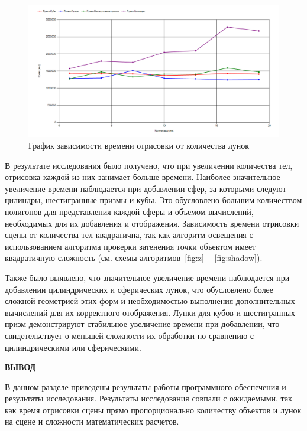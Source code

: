 \begin{figure}[H]
    \centering
    \includegraphics[width=1\linewidth]{img/graph_ind.png}
    \caption{График зависимости времени отрисовки от количества лунок}
    \label{fig:ind}
\end{figure}

В результате исследования было получено, что при увеличении количества тел, отрисовка каждой из них занимает больше времени. Наиболее значительное увеличение времени наблюдается при добавлении сфер, за которыми следуют цилиндры, шестигранные призмы и кубы. Это обусловлено большим количеством полигонов для представления каждой сферы и объемом вычислений, необходимых для их добавления и отображения. Зависимость времени отрисовки сцены от количества тел квадратична, так как алгоритм освещения с использованием алгоритма проверки затенения точки объектом имеет квадратичную сложность (см. схемы алгоритмов~\ref{fig:z}$-$~\ref{fig:shadow}).

Также было выявлено, что значительное увеличение времени наблюдается при добавлении цилиндрических и сферических лунок, что обусловлено более сложной геометрией этих форм и необходимостью выполнения дополнительных вычислений для их корректного отображения. Лунки для кубов и шестигранных призм демонстрируют стабильное увеличение времени при добавлении, что свидетельствует о меньшей сложности их обработки по сравнению с цилиндрическими или сферическими.

\textbf{ВЫВОД}

В данном разделе приведены результаты работы программного обеспечения и результаты исследования.
Результаты исследования совпали с ожидаемыми, так как время отрисовки сцены прямо пропорционально количеству объектов и лунок на сцене и сложности математических расчетов.
\clearpage